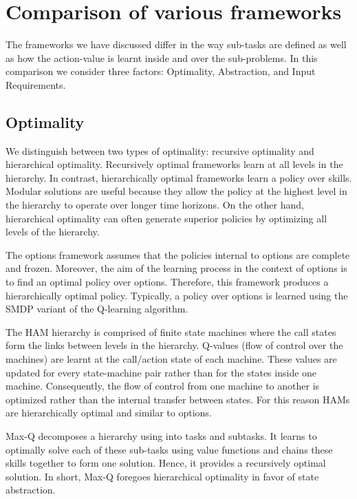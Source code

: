 \section{Comparison of various frameworks}

The frameworks we have discussed differ in the way sub-tasks are defined as well as how the action-value is learnt
inside and over the sub-problems. In this comparison we consider three factors: Optimality, Abstraction,
and Input Requirements.


\subsection{Optimality}

We distinguish between two types of optimality: recursive optimality and hierarchical optimality.
Recursively optimal frameworks learn at all levels in the hierarchy.
In contrast, hierarchically optimal frameworks learn a policy over skills.
Modular solutions are useful because they allow the policy at the highest level in the hierarchy to operate over longer
time horizons. On the other hand, hierarchical optimality can often generate superior policies by optimizing
all levels of the hierarchy.

The options framework assumes that the policies internal to options are complete and frozen.
Moreover, the aim of the learning process in the context of options is to find an optimal policy
over options. Therefore, this framework produces a hierarchically optimal policy.
Typically, a policy over options is learned using the SMDP variant of the Q-learning algorithm.

The HAM hierarchy is comprised of finite state machines where the call states form the links between levels in the hierarchy.
Q-values (flow of control over the machines) are learnt at the call/action state of each machine.
These values are updated for every state-machine pair rather than for the states inside one machine.
Consequently, the flow of control from one machine to another is optimized rather than the internal transfer between states.
For this reason HAMs are hierarchically optimal and similar to options.

Max-Q decomposes a hierarchy using into tasks and subtasks.
It learns to optimally solve each of these sub-tasks using
value functions and chains these skills together to form one solution.
Hence, it provides a recursively optimal solution.
In short, Max-Q foregoes hierarchical optimality in favor of state abstraction.

